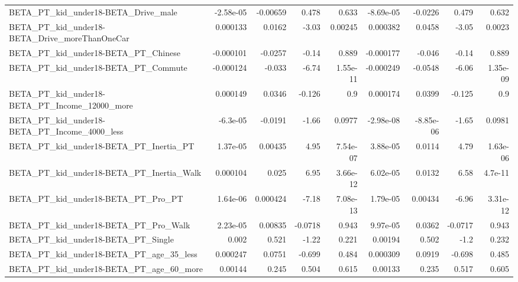 \begin{tabular}{lrrrrrrrr}
BETA\_PT\_kid\_under18-BETA\_Drive\_male                &   -2.58e-05 &     -0.00659 &    0.478 &    0.633 &  -8.69e-05 &     -0.0226 &        0.479 &         0.632 \\
BETA\_PT\_kid\_under18-BETA\_Drive\_moreThanOneCar      &    0.000133 &       0.0162 &    -3.03 &  0.00245 &   0.000382 &      0.0458 &        -3.05 &        0.0023 \\
BETA\_PT\_kid\_under18-BETA\_PT\_Chinese                &   -0.000101 &      -0.0257 &    -0.14 &    0.889 &  -0.000177 &      -0.046 &        -0.14 &         0.889 \\
BETA\_PT\_kid\_under18-BETA\_PT\_Commute                &   -0.000124 &       -0.033 &    -6.74 & 1.55e-11 &  -0.000249 &     -0.0548 &        -6.06 &      1.35e-09 \\
BETA\_PT\_kid\_under18-BETA\_PT\_Income\_12000\_more      &    0.000149 &       0.0346 &   -0.126 &      0.9 &   0.000174 &      0.0399 &       -0.125 &           0.9 \\
BETA\_PT\_kid\_under18-BETA\_PT\_Income\_4000\_less       &    -6.3e-05 &      -0.0191 &    -1.66 &   0.0977 &  -2.98e-08 &   -8.85e-06 &        -1.65 &        0.0981 \\
BETA\_PT\_kid\_under18-BETA\_PT\_Inertia\_PT             &    1.37e-05 &      0.00435 &     4.95 & 7.54e-07 &   3.88e-05 &      0.0114 &         4.79 &      1.63e-06 \\
BETA\_PT\_kid\_under18-BETA\_PT\_Inertia\_Walk           &    0.000104 &        0.025 &     6.95 & 3.66e-12 &   6.02e-05 &      0.0132 &         6.58 &       4.7e-11 \\
BETA\_PT\_kid\_under18-BETA\_PT\_Pro\_PT                 &    1.64e-06 &     0.000424 &    -7.18 & 7.08e-13 &   1.79e-05 &     0.00434 &        -6.96 &      3.31e-12 \\
BETA\_PT\_kid\_under18-BETA\_PT\_Pro\_Walk               &    2.23e-05 &      0.00835 &  -0.0718 &    0.943 &   9.97e-05 &      0.0362 &      -0.0717 &         0.943 \\
BETA\_PT\_kid\_under18-BETA\_PT\_Single                 &       0.002 &        0.521 &    -1.22 &    0.221 &    0.00194 &       0.502 &         -1.2 &         0.232 \\
BETA\_PT\_kid\_under18-BETA\_PT\_age\_35\_less            &    0.000247 &       0.0751 &   -0.699 &    0.484 &   0.000309 &      0.0919 &       -0.698 &         0.485 \\
BETA\_PT\_kid\_under18-BETA\_PT\_age\_60\_more            &     0.00144 &        0.245 &    0.504 &    0.615 &    0.00133 &       0.235 &        0.517 &         0.605 \\

\end{tabular}
